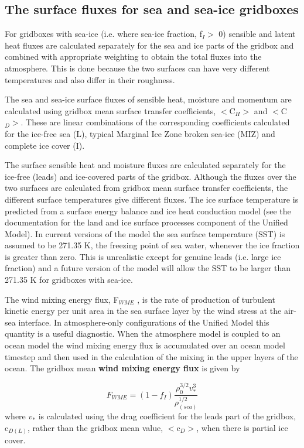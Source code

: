 \documentclass{UMDP_article}
\begin{document}
\subsection{The surface fluxes for sea and sea-ice
  gridboxes}\label{section_1.6}
For gridboxes with sea-ice (i.e. where sea-ice fraction, f$_{I} >$ 0)
sensible and latent heat fluxes are calculated separately for the sea
and ice parts of the gridbox and combined with appropriate weighting
to obtain the total fluxes into the atmosphere. This is done because
the two surfaces can have very different temperatures and also differ
in their roughness.

The sea and sea-ice surface fluxes of sensible heat, moisture and
momentum are calculated using gridbox mean surface transfer
coefficients, $<$C$_{H}>$ and $<$C$_{D}>$. These are linear
combinations of the corresponding coefficients calculated for the
ice-free sea (L), typical Marginal Ice Zone broken sea-ice (MIZ) and
complete ice cover (I).

The surface sensible heat and moisture fluxes are calculated
separately for the ice-free (leads) and ice-covered parts of the
gridbox. Although the fluxes over the two surfaces are calculated from
gridbox mean surface transfer coefficients, the different surface
temperatures give different fluxes. The ice surface temperature is
predicted from a surface energy balance and ice heat conduction model
(see the documentation for the land and ice surface processes
component of the Unified Model). In current versions of the model the
sea surface temperature (SST) is assumed to be 271.35 K, the freezing
point of sea water, whenever the ice fraction is greater than
zero. This is unrealistic except for genuine leads (i.e.  large ice
fraction) and a future version of the model will allow the SST to be
larger than 271.35 K for gridboxes with sea-ice.

The wind mixing energy flux, F$_{WME}$ , is the rate of production of
turbulent kinetic energy per unit area in the sea surface layer by the
wind stress at the air-sea interface. In atmosphere-only
configurations of the Unified Model this quantity is a useful
diagnostic. When the atmosphere model is coupled to an ocean model the
wind mixing energy flux is accumulated over an ocean model timestep
and then used in the calculation of the mixing in the upper layers of
the ocean. The gridbox mean \textbf{wind mixing energy flux} is given
by

\begin{equation}
  F_{WME} = ( 1-  f_I ) \frac{ \rho _0^{3/2}  v_\ast ^3 }{ \rho _{(sea)}^{1/2} }
  \label{1.6.9}
\end{equation}
where $v_{\ast }$ is calculated using the drag coefficient for the
leads part of the gridbox, c$_{D(L)}$, rather than the gridbox mean
value, $<$c$_{D}>$, when there is partial ice cover.
\end{document}
